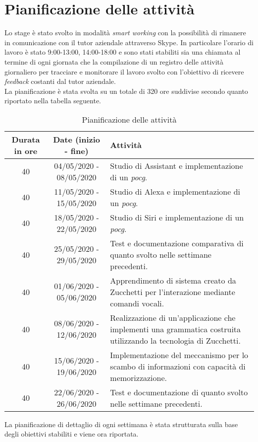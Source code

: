 \section{Pianificazione delle attività}
Lo stage è stato svolto in modalità \emph{smart working} con la possibilità di rimanere in comunicazione con il tutor aziendale attraverso Skype. In particolare l'orario di lavoro è stato 9:00-13:00, 14:00-18:00 e sono stati stabiliti sia una chiamata al termine di ogni giornata che la compilazione di un registro delle attività giornaliero per tracciare e monitorare il lavoro svolto con l'obiettivo di ricevere \emph{feedback} costanti dal tutor aziendale. \\
La pianificazione è stata svolta su un totale di 320 ore suddivise secondo quanto riportato nella tabella seguente.
\begin{table}
	\begin{tabularx}{\textwidth}{|c|c|X|}
		\hline
		\textbf{Durata in ore} & \textbf{Date (inizio - fine)} & \textbf{Attività} \\\hline
		
		40 & 04/05/2020 - 08/05/2020 & Studio di Assistant e implementazione di un \emph{\gls{pocg}}. \\
		\hline
		40 & 11/05/2020 - 15/05/2020 & Studio di Alexa e implementazione di un \emph{\gls{pocg}}. \\
		\hline
		40 & 18/05/2020 - 22/05/2020 & Studio di Siri e implementazione di un \emph{\gls{pocg}}. \\
		\hline
		40 & 25/05/2020 - 29/05/2020 & Test e documentazione comparativa di quanto svolto nelle settimane precedenti. \\
		\hline
		40 & 01/06/2020 - 05/06/2020 & Apprendimento di sistema creato da Zucchetti per l'interazione mediante comandi vocali. \\
		\hline
		40 & 08/06/2020 - 12/06/2020 & Realizzazione di un'applicazione che implementi una grammatica costruita utilizzando la tecnologia di Zucchetti. \\
		\hline
		40 & 15/06/2020 - 19/06/2020 & Implementazione del meccanismo per lo scambo di informazioni con capacità di memorizzazione. \\
		\hline
		40 & 22/06/2020 - 26/06/2020 & Test e documentazione di quanto svolto nelle settimane precedenti. \\	
		\hline
	\end{tabularx}
	\caption{Pianificazione delle attività}
\end{table}
La pianificazione di dettaglio di ogni settimana è stata strutturata sulla base degli obiettivi stabiliti e viene ora riportata.
